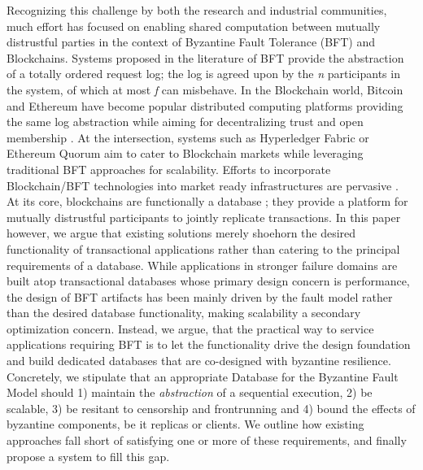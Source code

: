 Recognizing this challenge by both the research and industrial communities, much effort has focused on enabling shared computation  between mutually distrustful parties in the context of Byzantine Fault Tolerance (BFT) and Blockchains. 
Systems proposed in the literature of BFT provide the abstraction of a totally ordered request log; the log is agreed upon by the \textit{n} participants in the system, of which at most \textit{f} can misbehave. In the Blockchain world, Bitcoin and Ethereum have become popular distributed computing platforms providing the same log abstraction while aiming for decentralizing trust and open membership . At the intersection, systems such as Hyperledger Fabric \cite{Hyperledger} or Ethereum Quorum \cite{EthereumQuorum} aim to cater to Blockchain markets while leveraging traditional BFT approaches for scalability. Efforts to incorporate Blockchain/BFT technologies into market ready infrastructures are pervasive \cite{StateFarmQuorum, AutoInventory, StateFarmQuorum2, HyperledgerTelecom, HyperledgerHealth}. \\


At its core, blockchains are functionally a database ; they provide a platform for mutually distrustful participants to jointly replicate transactions.
In this paper however, we argue that existing solutions merely shoehorn the desired functionality of transactional applications rather than catering to the principal requirements of a database. 
While applications in stronger failure domains  are built atop transactional databases whose primary design concern is performance, the design of BFT artifacts has been mainly driven by the fault model rather than the desired database functionality, making scalability a secondary optimization concern. 
Instead, we argue, that the practical  way to service applications requiring BFT is to let the functionality drive the design foundation and build dedicated databases that are co-designed with byzantine resilience. 
Concretely, we stipulate that an appropriate Database for the Byzantine Fault Model should 1) maintain the \textit{abstraction} of a sequential execution, 2) be scalable, 3) be resitant to censorship and frontrunning and 4) bound the effects of byzantine components, be it replicas or clients.
We outline how existing approaches fall short of satisfying one or more of these requirements, and finally propose a system to fill this gap.

